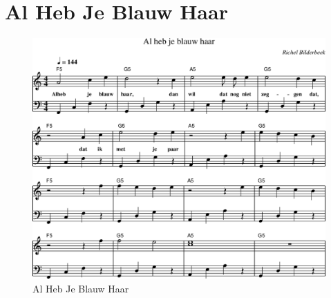 \chapter{Al Heb Je Blauw Haar}



\begin{figure}[!htbp]
  \includegraphics[width=\textwidth,height=\textheight,keepaspectratio]{../songs/20_al_heb_je_blauw_haar.png}
  \caption{Al Heb Je Blauw Haar}
  \label{fig:20_al_heb_je_blauw_haar}
\end{figure}
